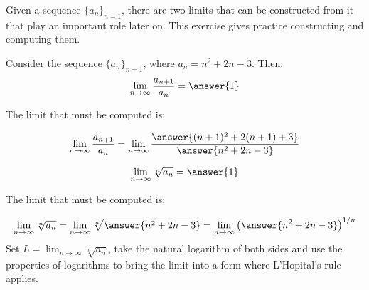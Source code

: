 \documentclass{ximera}
\author{Jim Talamo}
\begin{document}
\begin{exercise}

Given a sequence $\{a_n\}_{n=1}$, there are two limits that can be constructed from it that play an important role later on.  This exercise gives practice constructing and computing them.

Consider the sequence $\{a_n \}_{n=1}$, where $a_n =n^2+2n-3$.  Then:
\[
\lim_{n \to \infty} \frac{a_{n+1}}{a_n} = \answer{1}
\]

\begin{hint}
The limit that must be computed is:

\[
\lim_{n \to \infty} \frac{a_{n+1}}{a_n} = \lim_{n \to \infty} \frac{\answer{(n+1)^2+2(n+1)+3}}{\answer{n^2+2n-3}}
\]

\end{hint}

\[
\lim_{n \to \infty} \sqrt[n]{a_n} = \answer{1}
\]
\begin{hint}
The limit that must be computed is:

\[
\lim_{n \to \infty} \sqrt[n]{a_n} = \lim_{n \to \infty} \sqrt[n]{\answer{n^2+2n-3}} =  \lim_{n \to \infty} \left(\answer{n^2+2n-3}\right)^{1/n}
\]
Set $L = \lim_{n \to \infty} \sqrt[n]{a_n}$, take the natural logarithm of both sides and use the properties of logarithms to bring the limit into a form where L'Hopital's rule applies.
\end{hint}
\end{exercise}
\end{document}
